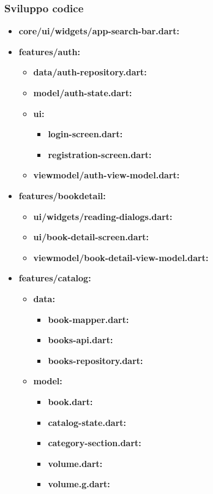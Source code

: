 \documentclass{article}
\begin{document}
\subsubsection{Sviluppo codice}
\begin{itemize}
  \item \textbf{core/ui/widgets/app-search-bar.dart:}
  \item \textbf{features/auth:}
  \begin{itemize}
    \item \textbf{data/auth-repository.dart:}
    \item \textbf{model/auth-state.dart:}
    \item \textbf{ui:}
    \begin{itemize}
      \item \textbf{login-screen.dart:}
      \item \textbf{registration-screen.dart:}
    \end{itemize}
    \item \textbf{viewmodel/auth-view-model.dart:}
  \end{itemize}
  \item \textbf{features/bookdetail:}
  \begin{itemize}
    \item \textbf{ui/widgets/reading-dialogs.dart:}
    \item \textbf{ui/book-detail-screen.dart:}
    \item \textbf{viewmodel/book-detail-view-model.dart:}
  \end{itemize}
  \item \textbf{features/catalog:}
  \begin{itemize}
    \item \textbf{data:}
    \begin{itemize}
      \item \textbf{book-mapper.dart:}
      \item \textbf{books-api.dart:}
      \item \textbf{books-repository.dart:}
    \end{itemize}
    \item \textbf{model:}
    \begin{itemize}
      \item \textbf{book.dart:}
      \item \textbf{catalog-state.dart:}
      \item \textbf{category-section.dart:}
      \item \textbf{volume.dart:}
      \item \textbf{volume.g.dart:}

\end{itemize}
\end{itemize}
\end{itemize}
\end{document}
